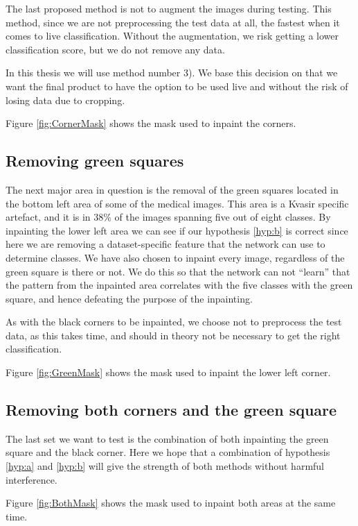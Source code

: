 The last proposed method is not to augment the images during testing. This method, since we are not preprocessing the test data at all, the fastest when it comes to live classification. Without the augmentation, we risk getting a lower classification score, but we do not remove any data.


In this thesis we will use method number 3). 
We base this decision on that we want the final product to have the option to be used live and without the risk of losing data due to cropping.

Figure \ref{fig:CornerMask} shows the mask used to inpaint the corners.


 
\subsection{Removing green squares}
The next major area in question is the removal of the green squares located in the bottom left area of some of the medical images.  This area is a Kvasir specific artefact, and it is in 38\% of the images spanning five out of eight classes. 
By inpainting the lower left area we can see if our hypothesis \ref{hyp:b} is correct since here we are removing a dataset-specific feature that the network can use to determine classes. 
We have also chosen to inpaint every image, regardless of the green square is there or not. We do this so that the network can not ``learn'' that the pattern from the inpainted area correlates with the five classes with the green square, and hence defeating the purpose of the inpainting.


As with the black corners to be inpainted, we choose not to preprocess the test data, as this takes time, and should in theory not be necessary to get the right classification.
 
Figure \ref{fig:GreenMask} shows the mask used to inpaint the lower left corner.

\subsection{Removing both corners and the green square}
The last set we want to test is the combination of both inpainting the green square and the black corner. 
Here we hope that a combination of hypothesis \ref{hyp:a} and \ref{hyp:b} will give the strength of both methods without harmful interference. 

Figure \ref{fig:BothMask} shows the mask used to inpaint both areas at the same time.


